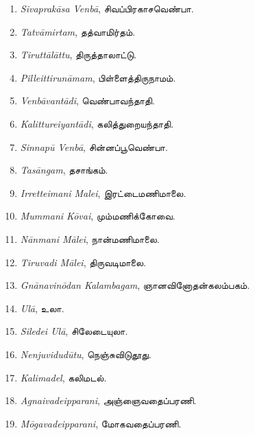 \documentclass{article}
\newcommand{\TamilText}[1]{\texttamil{#1}}
\newcommand{\tam}[1]{\TamilText{#1}}
\begin{document}
\begin{enumerate}\small
    \item \emph{Sivaprak\={a}sa Venb\={a}}, \tam{சிவப்பிரகாசவெண்பா}.

    \item \emph{Tatv\={a}mirtam}, \tam{தத்வாமிர்தம்}.

    \item \emph{Tirutt\={a}l\={a}ttu}, \tam{திருத்தாலாட்டு}.

    \item \emph{Pilleittirun\={a}mam}, \tam{பிள்ளைத்திருநாமம்}.

    \item \emph{Venb\={a}vant\={a}di}, \tam{வெண்பாவந்தாதி}.

    \item \emph{Kalittureiyant\={a}di}, \tam{கலித்துறையந்தாதி}.

    \item \emph{Sinnap\={u} Venb\={a}}, \tam{சின்னப்பூவெண்பா}.

    \item \emph{Tas\={a}ngam}, \tam{தசாங்கம்}.

    \item \emph{Irretteimani Malei}, \tam{இரட்டைமணிமாலை}.

    \item \emph{Mummani K\={o}vai}, \tam{மும்மணிக்கோவை}.

    \item \emph{N\={a}nmani M\={a}lei}, \tam{நான்மணிமாலை}.

    \item \emph{Tiruvadi M\={a}lei}, \tam{திருவடிமாலை}.

    \item \emph{Gn\={a}navin\={o}dan Kalambagam}, \tam{ஞானவினோதன்கலம்பகம்}.

    \item \emph{Ul\={a}}, \tam{உலா}.

    \item \emph{Siledei Ul\={a}}, \tam{சிலேடையுலா}.

    \item \emph{Nenjuvidud\={u}tu}, \tam{நெஞ்சுவிடுதூது}.

    \item \emph{Kalimadel}, \tam{கலிமடல்}.

    \item \emph{Agnaivadeipparani}, \tam{அஞ்ஞைவதைப்பரணி}.

    \item \emph{M\={o}gavadeipparani}, \tam{மோகவதைப்பரணி}.


\end{enumerate}
\end{document}
